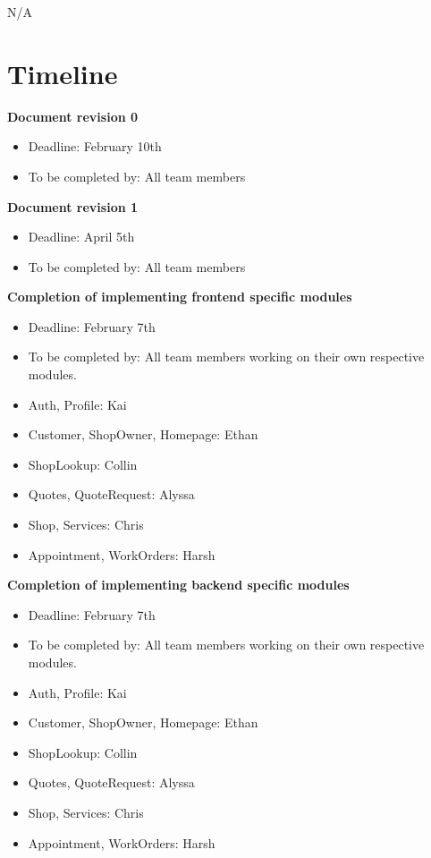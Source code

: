 \documentclass[12pt, titlepage]{article}
\begin{document}
N/A

\section{Timeline}
\noindent \textbf{Document revision 0}
\begin{itemize}
    \item Deadline: February 10th
    \item To be completed by: All team members
\end{itemize}

\noindent \textbf{Document revision 1}
\begin{itemize}
    \item Deadline: April 5th
    \item To be completed by: All team members
\end{itemize}

\noindent \textbf{Completion of implementing frontend specific modules}
\begin{itemize}
    \item Deadline: February 7th
    \item To be completed by: All team members working on their own respective modules.
    \item Auth, Profile: Kai
    \item Customer, ShopOwner, Homepage: Ethan
    \item ShopLookup: Collin
    \item Quotes, QuoteRequest: Alyssa
    \item Shop, Services: Chris
    \item Appointment, WorkOrders: Harsh
\end{itemize}

\noindent \textbf{Completion of implementing backend specific modules}
\begin{itemize}
    \item Deadline: February 7th
    \item To be completed by: All team members working on their own respective modules.
    \item Auth, Profile: Kai
    \item Customer, ShopOwner, Homepage: Ethan
    \item ShopLookup: Collin
    \item Quotes, QuoteRequest: Alyssa
    \item Shop, Services: Chris
    \item Appointment, WorkOrders: Harsh
\end{itemize}
\end{document}
